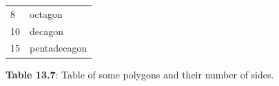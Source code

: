 \begin{table}[H]
{{\begin{center}
\begin{xtabular}[t]{|l|l|}
    
        8 &
    
    
        octagon%
     \tabularnewline{}
    
    
        10 &
    
    
        decagon%
     \tabularnewline{}
    
    
        15 &
    
    
        pentadecagon%
     \tabularnewline{}
    \end{xtabular}
      \end{center}
    \begin{center}{\small\bfseries Table 13.7}: Table of some polygons and their number of sides.\end{center}
    
    \addtocounter{footnote}{-0}
    
          } %
        }{%
        }
\end{table}
